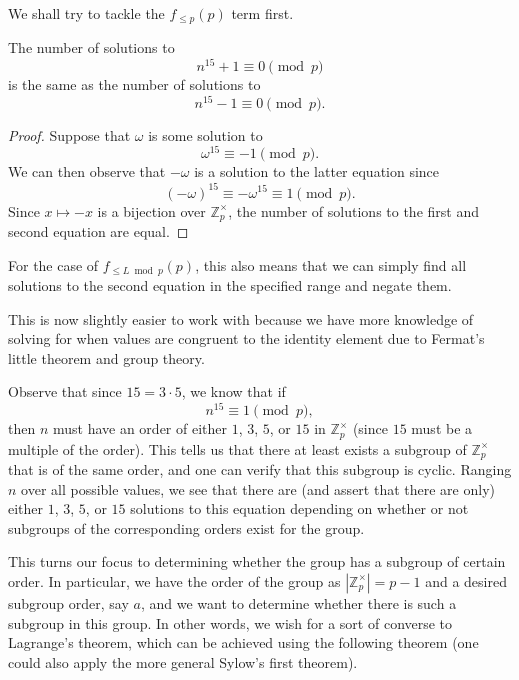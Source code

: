 \documentclass[a4paper, 12pt]{article}
\begin{document}
\begin{solution}
    We shall try to tackle the \( f_{\le p}(p) \) term first.

    \begin{observation}
        The number of solutions to
        \[
            n^{15} + 1 \equiv 0 \pmod{p}
        \]
        is the same as the number of solutions to
        \[
            n^{15} - 1 \equiv 0 \pmod{p}
        .\]
    \end{observation}

    \begin{proof}
        Suppose that \( \omega \) is some solution to
        \[
            \omega^{15} \equiv -1 \pmod{p}
        .\]
        We can then observe that \( -\omega \) is a solution to the latter equation since
        \[
            (-\omega)^{15} \equiv -\omega^{15} \equiv 1 \pmod{p}
        .\]
        Since \( x \mapsto -x \) is a bijection over \( \mathbb{Z}_{p}^{\times} \), the number of solutions to the first and second equation are equal.
    \end{proof}

    For the case of \( f_{\le L \bmod p}(p) \), this also means that we can simply find all solutions to the second equation in the specified range and negate them.

    This is now slightly easier to work with because we have more knowledge of solving for when values are congruent to the identity element due to Fermat's little theorem and group theory.

    \begin{observation}
        Observe that since \( 15 = 3 \cdot 5 \), we know that if
        \[
            n^{15} \equiv 1 \pmod{p}
        ,\]
        then \( n \) must have an order of either \( 1 \), \( 3 \), \( 5 \), or \( 15 \) in \( \mathbb{Z}_p^{\times} \) (since \( 15 \) must be a multiple of the order). This tells us that there at least exists a subgroup of \( \mathbb{Z}_p^{\times} \) that is of the same order, and one can verify that this subgroup is cyclic. Ranging \( n \) over all possible values, we see that there are (and assert that there are only) either \( 1 \), \( 3 \), \( 5 \), or \( 15 \) solutions to this equation depending on whether or not subgroups of the corresponding orders exist for the group.
    \end{observation}

    This turns our focus to determining whether the group has a subgroup of certain order. In particular, we have the order of the group as \( | \mathbb{Z}_p^\times | = p - 1 \) and a desired subgroup order, say \( a \), and we want to determine whether there is such a subgroup in this group. In other words, we wish for a sort of converse to Lagrange's theorem, which can be achieved using the following theorem (one could also apply the more general Sylow's first theorem).


\end{solution}
\end{document}
